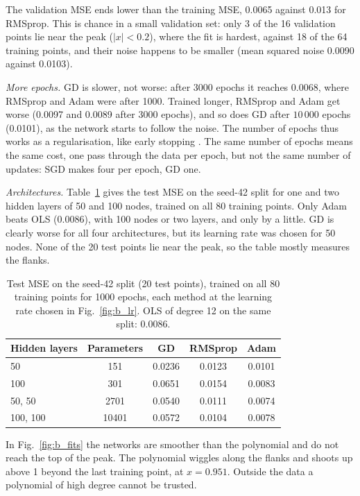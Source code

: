 The validation MSE ends lower than the training MSE, 0.0065 against 0.013 for RMSprop. This is chance in a small validation set: only 3 of the 16 validation points lie near the peak ($|x| < 0.2$), where the fit is hardest, against 18 of the 64 training points, and their noise happens to be smaller (mean squared noise 0.0090 against 0.0103).

\emph{More epochs.} GD is slower, not worse: after 3000 epochs it reaches 0.0068, where RMSprop and Adam were after 1000. Trained longer, RMSprop and Adam get worse (0.0097 and 0.0089 after 3000 epochs), and so does GD after $10\,000$ epochs (0.0101), as the network starts to follow the noise. The number of epochs thus works as a regularisation, like early stopping \cite[Sec.~8.12]{HjorthJensen2026}. The same number of epochs means the same cost, one pass through the data per epoch, but not the same number of updates: SGD makes four per epoch, GD one.

\emph{Architectures.} Table~\ref{tab:b_test} gives the test MSE on the seed-42 split for one and two hidden layers of 50 and 100 nodes, trained on all 80 training points. Only Adam beats OLS (0.0086), with 100 nodes or two layers, and only by a little. GD is clearly worse for all four architectures, but its learning rate was chosen for 50 nodes. None of the 20 test points lie near the peak, so the table mostly measures the flanks.

\begin{table}
    \centering
    \caption{Test MSE on the seed-42 split (20 test points), trained on all 80 training points for 1000 epochs, each method at the learning rate chosen in Fig.~\ref{fig:b_lr}. OLS of degree 12 on the same split: 0.0086.}
    \label{tab:b_test}
    \begin{tabular}{lcccc}
        \toprule
        Hidden layers & Parameters & GD & RMSprop & Adam \\
        \midrule
        50       & 151   & 0.0236 & 0.0123 & 0.0101 \\
        100      & 301   & 0.0651 & 0.0154 & 0.0083 \\
        50, 50   & 2701  & 0.0540 & 0.0111 & 0.0074 \\
        100, 100 & 10401 & 0.0572 & 0.0104 & 0.0078 \\
        \bottomrule
    \end{tabular}
\end{table}

In Fig.~\ref{fig:b_fits} the networks are smoother than the polynomial and do not reach the top of the peak. The polynomial wiggles along the flanks and shoots up above 1 beyond the last training point, at $x = 0.951$. Outside the data a polynomial of high degree cannot be trusted.

